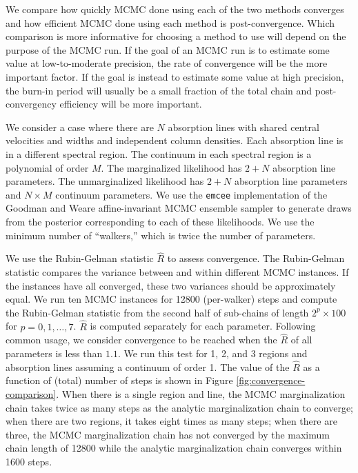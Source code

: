 \documentclass[trackchanges]{aastex62}
\begin{document}
{We compare how quickly MCMC done using each of the two methods converges and how efficient MCMC done using each method is post-convergence.
Which comparison is more informative for choosing a method to use will depend on the purpose of the MCMC run.
If the goal of an MCMC run is to estimate some value at low-to-moderate precision, the rate of convergence will be the more important factor.
If the goal is instead to estimate some value at high precision, the burn-in period will usually be a small fraction of the total chain and post-convergency efficiency will be more important.

We consider a case where there are $N$ absorption lines with shared central velocities and widths and independent column densities.
Each absorption line is in a different spectral region.
The continuum in each spectral region is a polynomial of order $M$.
The marginalized likelihood has $2 + N$ absorption line parameters.
The unmarginalized likelihood has $2 + N$ absorption line parameters and $N \times M$ continuum parameters.
We use the \texttt{emcee} implementation of the Goodman and Weare affine-invariant MCMC ensemble sampler to generate draws from the posterior corresponding to each of these likelihoods.
We use the minimum number of ``walkers,'' which is twice the number of parameters.

We use the Rubin-Gelman statistic $\hat{R}$ \citep{Gelman:1992zz} to assess convergence.
The Rubin-Gelman statistic compares the variance between and within different MCMC instances.
If the instances have all converged, these two variances should be approximately equal.
We run ten MCMC instances for 12800 (per-walker) steps and compute the Rubin-Gelman statistic from the second half of sub-chains of length $2^p \times 100$ for $p=0, 1, \ldots, 7$.
$\hat{R}$ is computed separately for each parameter.
Following common usage, we consider convergence to be reached when the $\hat{R}$ of all parameters is less than $1.1$.
We run this test for 1, 2, and 3 regions and absorption lines assuming a continuum of order 1.
The value of the $\hat{R}$ as a function of (total) number of steps is shown in Figure \ref{fig:convergence-comparison}.
When there is a single region and line, the MCMC marginalization chain takes twice as many steps as the analytic marginalization chain to converge; when there are two regions, it takes eight times as many steps; when there are three, the MCMC marginalization chain has not converged by the maximum chain length of 12800 while the analytic marginalization chain converges within 1600 steps.

}
\end{document}
